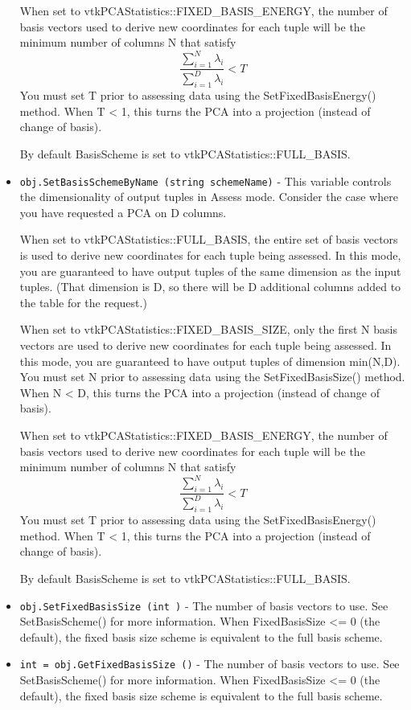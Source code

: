 \begin{itemize}
 When set to vtkPCAStatistics::FIXED\_BASIS\_ENERGY, the number of basis vectors
 used to derive new coordinates for each tuple will be the minimum number
 of columns N that satisfy
 \[
   \frac{\sum_{i=1}^{N} \lambda_i}{\sum_{i=1}^{D} \lambda_i} < T
 \]
 You must set T prior to assessing data using the SetFixedBasisEnergy() method.
 When T < 1, this turns the PCA into a projection (instead of change of basis).

 By default BasisScheme is set to vtkPCAStatistics::FULL\_BASIS.

\item  \verb|obj.SetBasisSchemeByName (string schemeName)| -  This variable controls the dimensionality of output tuples in Assess mode.
 Consider the case where you have requested a PCA on D columns.

 When set to vtkPCAStatistics::FULL\_BASIS, the entire set of basis vectors
 is used to derive new coordinates for each tuple being assessed.
 In this mode, you are guaranteed to have output tuples of the same dimension
 as the input tuples. (That dimension is D, so there will be D additional
 columns added to the table for the request.)

 When set to vtkPCAStatistics::FIXED\_BASIS\_SIZE, only the first N basis vectors
 are used to derive new coordinates for each tuple being assessed.
 In this mode, you are guaranteed to have output tuples of dimension min(N,D).
 You must set N prior to assessing data using the SetFixedBasisSize() method.
 When N < D, this turns the PCA into a projection (instead of change of basis).

 When set to vtkPCAStatistics::FIXED\_BASIS\_ENERGY, the number of basis vectors
 used to derive new coordinates for each tuple will be the minimum number
 of columns N that satisfy
 \[
   \frac{\sum_{i=1}^{N} \lambda_i}{\sum_{i=1}^{D} \lambda_i} < T
 \]
 You must set T prior to assessing data using the SetFixedBasisEnergy() method.
 When T < 1, this turns the PCA into a projection (instead of change of basis).

 By default BasisScheme is set to vtkPCAStatistics::FULL\_BASIS.

\item  \verb|obj.SetFixedBasisSize (int )| -  The number of basis vectors to use. See SetBasisScheme() for more information.
 When FixedBasisSize <= 0 (the default), the fixed basis size scheme is equivalent to the full basis scheme.

\item  \verb|int = obj.GetFixedBasisSize ()| -  The number of basis vectors to use. See SetBasisScheme() for more information.
 When FixedBasisSize <= 0 (the default), the fixed basis size scheme is equivalent to the full basis scheme.


\end{itemize}
